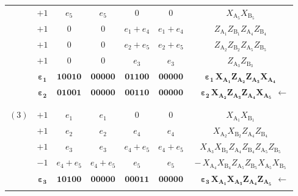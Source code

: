 \documentclass[journal,onecolumn]{IEEEtran}
\begin{document}
\begin{table}
\begin{tabularx}{.8\linewidth}{c c || *{2}{C} | *{2}{C} || c}
     & $+1$ &    $e_5$ & $e_5$   &   $0$ & $0$    & $X_{\text{A}_5} X_{\text{B}_5}$ \\
\cmidrule(lr){2-7}
     & $+1$ &    $0$ & $0$   &   $e_1+e_4$ & $e_1+e_4$    & $Z_{\text{A}_1} Z_{\text{B}_1} Z_{\text{A}_4} Z_{\text{B}_4}$ \\
     & $+1$ &    $0$ & $0$   &   $e_2+e_5$ & $e_2+e_5$    & $Z_{\text{A}_2} Z_{\text{B}_2} Z_{\text{A}_5} Z_{\text{B}_5}$ \\
     & $+1$ &    $0$ & $0$   &   $e_3$ & $e_3$    & $Z_{\text{A}_3} Z_{\text{B}_3}$ \\
     & $\boldsymbol{ \varepsilon_1 }$ &    $\boldsymbol{ 10010 }$ & $\boldsymbol{ 00000 }$   &   $\boldsymbol{ 01100 }$ & $\boldsymbol{ 00000 }$    & $\boldsymbol{ \varepsilon_1 \, X_{\text{A}_1} Z_{\text{A}_2} Z_{\text{A}_3} X_{\text{A}_4} }$ \\
     & $\boldsymbol{ \varepsilon_2 }$ &    $\boldsymbol{ 01001 }$ & $\boldsymbol{ 00000 }$   &   $\boldsymbol{ 00110 }$ & $\boldsymbol{ 00000 }$    & \qquad \ \  $\boldsymbol{ \varepsilon_2 \, X_{\text{A}_2} Z_{\text{A}_3} Z_{\text{A}_4} X_{\text{A}_5} } \ \ \boldsymbol{\longleftarrow}$ \\
%
     &     &        &       &         &          &                   \\
%
\midrule
%
     &     &        &       &         &          &                   \\
%
$(3)$ & $+1$ &    $e_1$ & $e_1$   &   $0$ & $0$    & $X_{\text{A}_1} X_{\text{B}_1}$ \\
     & $+1$ &    $e_2$ & $e_2$   &   $e_4$ & $e_4$    & $X_{\text{A}_2} X_{\text{B}_2} Z_{\text{A}_4} Z_{\text{B}_4}$ \\
     & $+1$ &    $e_3$ & $e_3$   &   $e_4+e_5$ & $e_4+e_5$    & $X_{\text{A}_3} X_{\text{B}_3} Z_{\text{A}_4} Z_{\text{B}_4} Z_{\text{A}_5} Z_{\text{B}_5}$ \\
     & $-1$ &    $e_4+e_5$ & $e_4+e_5$   &   $e_5$ & $e_5$    & $- \, X_{\text{A}_4} X_{\text{B}_4} Z_{\text{A}_5} Z_{\text{B}_5} X_{\text{A}_5} X_{\text{B}_5}$ \\
     & $\boldsymbol{ \varepsilon_3 }$ &    $\boldsymbol{ 10100 }$ & $\boldsymbol{ 00000 }$   &   $\boldsymbol{ 00011 }$ & $\boldsymbol{ 00000 }$    & \qquad \ \  $\boldsymbol{ \varepsilon_3 \, X_{\text{A}_1} X_{\text{A}_3} Z_{\text{A}_4} Z_{\text{A}_5} } \ \ \boldsymbol{\longleftarrow}$ \\
\cmidrule(lr){2-7}

\end{tabularx}
\end{table}
\end{document}
